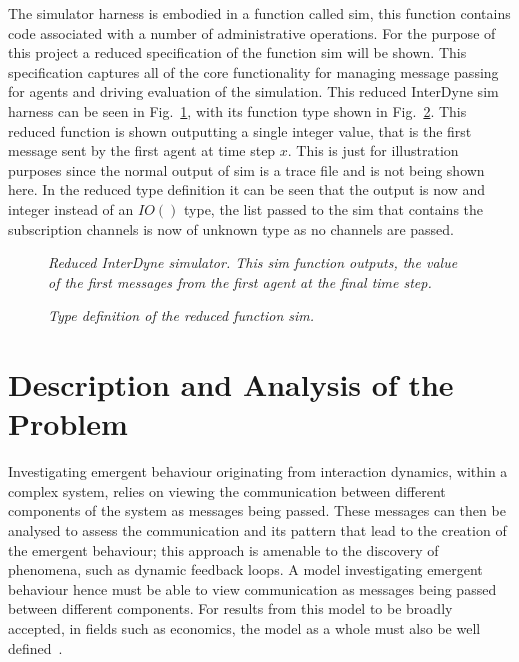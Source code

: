 \documentclass{article}
\begin{document}
The simulator harness is embodied in a function called sim, this function contains code associated with a number of administrative operations. For the purpose of this project a reduced specification of the function sim will be shown. This specification captures all of the core functionality for managing message passing for agents and driving evaluation of the simulation. This reduced InterDyne sim harness can be seen in Fig.~\ref{fig:intersimfun}, with its function type shown in Fig.~\ref{fig:reducedsimtypet}. This reduced function is shown outputting a single integer value, that is the first message sent by the first agent at time step $x$. This is just for illustration purposes since the normal output of sim is a trace file and is not being shown here. In the reduced type definition it can be seen that the output is now and integer instead of an $IO()$ type, the list passed to the sim that contains the subscription channels is now of unknown type as no channels are passed.   
 
\begin{figure}[H]
	\centering
        
	\caption{\it Reduced InterDyne simulator. This sim function outputs, the value of the first messages from the first agent at the final time step.}
	\label{fig:intersimfun}
\end{figure} 

\begin{figure}[H]
	\centering
        
	\caption{\it Type definition of the reduced function sim.}
	\label{fig:reducedsimtypet}
\end{figure} 







\newpage
\section {Description and Analysis of the Problem} \label{despriptionandanalysproblem}

Investigating emergent behaviour originating from interaction dynamics, within a complex system, relies on viewing the communication between different components of the system as messages being passed. These messages can then be analysed to assess the communication and its pattern that lead to the creation of the emergent behaviour; this approach is amenable to the discovery of phenomena, such as dynamic feedback loops. A model investigating emergent behaviour hence must be able to view communication as messages being passed between different components. For results from this model to be broadly accepted, in fields such as economics, the model as a whole must also be well defined~\cite{ebmabmi}.      
\end{document}
